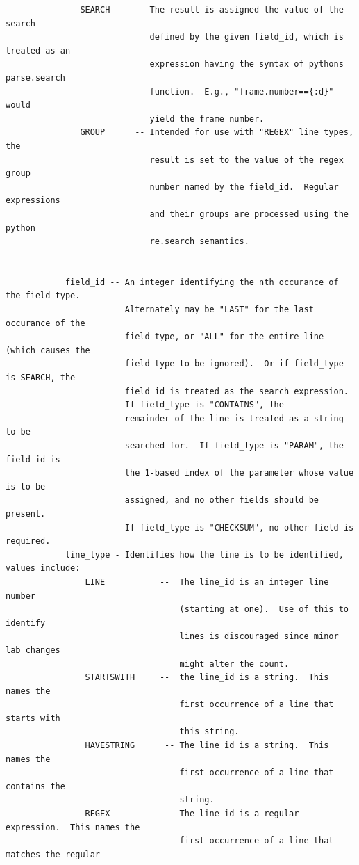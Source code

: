 \documentclass[12pt]{article}
\begin{document}
\begin{verbatim}
               SEARCH     -- The result is assigned the value of the search 
                             defined by the given field_id, which is treated as an
                             expression having the syntax of pythons parse.search 
                             function.  E.g., "frame.number=={:d}" would 
                             yield the frame number.
               GROUP      -- Intended for use with "REGEX" line types, the 
                             result is set to the value of the regex group 
                             number named by the field_id.  Regular expressions
                             and their groups are processed using the python
                             re.search semantics.
                             
                              
            field_id -- An integer identifying the nth occurance of the field type.
                        Alternately may be "LAST" for the last occurance of the 
                        field type, or "ALL" for the entire line (which causes the 
                        field type to be ignored).  Or if field_type is SEARCH, the
                        field_id is treated as the search expression. 
                        If field_type is "CONTAINS", the 
                        remainder of the line is treated as a string to be 
                        searched for.  If field_type is "PARAM", the field_id is
                        the 1-based index of the parameter whose value is to be 
                        assigned, and no other fields should be present.
                        If field_type is "CHECKSUM", no other field is required.
            line_type - Identifies how the line is to be identified, values include:
                LINE           --  The line_id is an integer line number 
                                   (starting at one).  Use of this to identify 
                                   lines is discouraged since minor lab changes 
                                   might alter the count.
                STARTSWITH     --  the line_id is a string.  This names the 
                                   first occurrence of a line that starts with 
                                   this string. 
                HAVESTRING      -- The line_id is a string.  This names the 
                                   first occurrence of a line that contains the 
                                   string.
                REGEX           -- The line_id is a regular expression.  This names the 
                                   first occurrence of a line that matches the regular

\end{verbatim}
\end{document}
